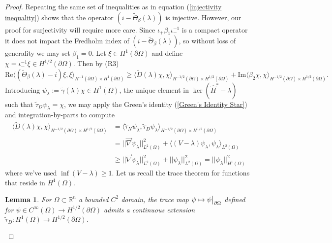 \documentclass{article}
\numberwithin{equation}{section}
\newtheorem{lemma}{Lemma}[section]
\begin{document}
\begin{proof}
    Repeating the same set of inequalities as in equation (\ref{injectivity inequality}) shows that the operator $(i - \tilde \Theta_\beta(\lambda))$ is injective. However, our proof for surjectivity will require more care. Since $\iota_+ \beta_1\iota_-^{-1}$ is a compact operator it does not impact the Fredholm index of $(i - \tilde \Theta_\beta(\lambda))$, so without loss of generality we may set $\beta_1=0$. Let $\xi \in H^1(\partial \Omega)$ and define $\chi=\iota_-^{-1}\xi \in H^{1/2}(\partial \Omega)$. Then by (R3)
    \begin{equation}\label{Real inequality}
        \text{Re}\langle ( \tilde{\Theta}_\beta(\lambda)-i )\xi,\xi \rangle_{H^{-1}(\partial \Omega)\times H^{1}(\partial \Omega)}\geq\langle \tilde D(\lambda) \chi, \chi\rangle_{H^{-1/2}(\partial \Omega)\times H^{1/2}(\partial \Omega)} + \text{Im}\langle \beta_2 \chi, \chi \rangle_{H^{-1/2}(\partial \Omega)\times H^{1/2}(\partial \Omega)}.
    \end{equation}
    Introducing $\psi_\lambda:=\tilde\gamma(\lambda)\chi\in H^1(\Omega)$, the unique element in $\ker(\hat{H}^*-\lambda)$ such that $\tilde \tau_D \psi_\lambda = \chi$, we may apply the Green's identity (\ref{Green's Identity Star}) and integration-by-parts to compute
    \begin{equation}
    \begin{split}
    \langle \tilde D(\lambda) \chi, \chi\rangle_{H^{-1/2}(\partial \Omega)\times H^{1/2}(\partial \Omega)}&=\langle\tilde{\tau}_N\psi_\lambda, \tilde{\tau}_D \psi_\lambda\rangle_{H^{-1/2}(\partial \Omega)\times H^{1/2}(\partial \Omega)}
    \\
    &=||\vec{\nabla} \psi_\lambda||_{L^2(\Omega)}^2 + \langle (V-\lambda)\psi_\lambda,\psi_\lambda\rangle_{L^2(\Omega)}
    \\
    & \geq  ||\vec{\nabla} \psi_\lambda||_{L^2(\Omega)}^2 + ||\psi_\lambda||^2_{L^2(\Omega)} = ||\psi_\lambda||^2_{H^1(\Omega)}
    \end{split}
    \end{equation}
    where we've used $\inf (V-\lambda)\geq1$. Let us recall the trace theorem for functions that reside in $H^1(\Omega)$.
    \begin{lemma}
        \cite[Theorem 1.5.1.2]{Grisvard} For $\Omega\subset \mathbb{R}^n$ a bounded $C^2$ domain, the trace map $\psi \mapsto \psi\big{|}_{\partial \Omega}$ defined for $\psi \in C^\infty(\Omega) \to H^{{1/2}}(\partial \Omega)$ admits a continuous extension $\tilde{\tau}_D:H^{1}(\Omega)\to H^{1/2}(\partial \Omega)$.

\end{lemma}
\end{proof}
\end{document}
